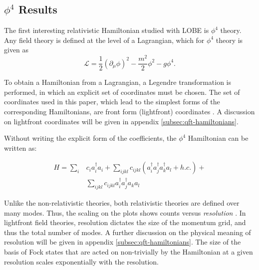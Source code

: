 \subsection{$\phi^4$ Results}
\label{sec:phi4_results}

The first interesting relativistic Hamiltonian studied with LOBE is $\phi^4$ theory. 
Any field theory is defined at the level of a Lagrangian, which for $\phi^4$ theory is given as
\begin{equation}
    \mathcal{L} = \frac12 \left(\partial_\mu \phi \right)^2 - \frac{m^2}{2}\phi^2 - g\phi^4.
\end{equation}

To obtain a Hamiltonian from a Lagrangian, a Legendre transformation is performed, in which an explicit set of coordinates must be chosen. 
The set of coordinates used in this paper, which lead to the simplest forms of the corresponding Hamiltonians, are front form (lightfront) coordinates \cite{Dirac1949}.
A discussion on lightfront coordinates will be given in appendix \ref{subsec:qft-hamiltonians}.

Without writing the explicit form of the coefficients, the $\phi^4$ Hamiltonian can be written as:

\begin{align}
    H = \sum_i &c_i a_i^\dagger a_i + \sum_{ijkl}c_{ijkl} \left(a_i^\dagger a_j^\dagger a_k^\dagger a_l + h.c. \right) + \nonumber\\
    &\sum_{ijkl}c_{ijkl}a_i^\dagger a_j^\dagger a_k a_l
\end{align}

Unlike the non-relativistic theories, both relativistic theories are defined over many modes.
Thus, the scaling on the plots shows counts versus \textit{resolution} \cite{}.
In lightfront field theories, resolution dictates the size of the momentum grid, and thus the total number of modes. 
A further discussion on the physical meaning of resolution will be given in appendix \ref{subsec:qft-hamiltonians}.
The size of the basis of Fock states that are acted on non-trivially by the Hamiltonian at a given resolution scales exponentially with the resolution.

